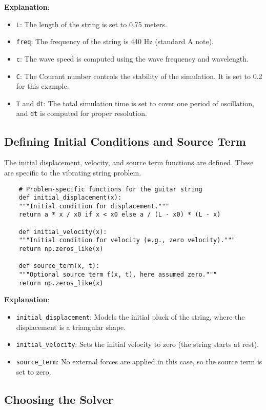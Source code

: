 \documentclass[a4paper, 11pt]{article}
\begin{document}
\textbf{Explanation}:
\begin{itemize}
	\item \texttt{L}: The length of the string is set to 0.75 meters.
	\item \texttt{freq}: The frequency of the string is 440 Hz (standard A note).
	\item \texttt{c}: The wave speed is computed using the wave frequency and wavelength.
	\item \texttt{C}: The Courant number controls the stability of the simulation. It is set to 0.2 for this example.
	\item \texttt{T} and \texttt{dt}: The total simulation time is set to cover one period of oscillation, and \texttt{dt} is computed for proper resolution.
\end{itemize}

\subsection{Defining Initial Conditions and Source Term}

The initial displacement, velocity, and source term functions are defined. These are specific to the vibrating string problem.

\lstset{language=Python}
\begin{lstlisting}
	# Problem-specific functions for the guitar string
	def initial_displacement(x):
	"""Initial condition for displacement."""
	return a * x / x0 if x < x0 else a / (L - x0) * (L - x)
	
	def initial_velocity(x):
	"""Initial condition for velocity (e.g., zero velocity)."""
	return np.zeros_like(x)
	
	def source_term(x, t):
	"""Optional source term f(x, t), here assumed zero."""
	return np.zeros_like(x)
\end{lstlisting}

\textbf{Explanation}:
\begin{itemize}
	\item \texttt{initial\_displacement}: Models the initial pluck of the string, where the displacement is a triangular shape.
	\item \texttt{initial\_velocity}: Sets the initial velocity to zero (the string starts at rest).
	\item \texttt{source\_term}: No external forces are applied in this case, so the source term is set to zero.
\end{itemize}

\subsection{Choosing the Solver}
\end{document}
